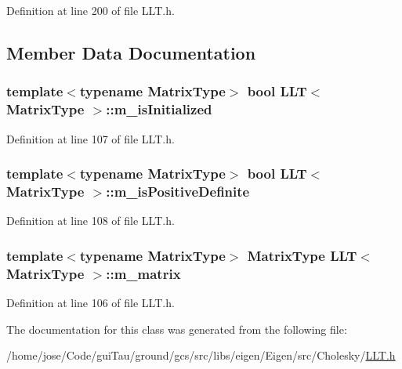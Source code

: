 Definition at line 200 of file L\-L\-T.\-h.



\subsection{Member Data Documentation}
\hypertarget{class_l_l_t_a538a8165865c01777995af8f30e9778a}{
\subsubsection[{m\-\_\-is\-Initialized}]{\setlength{\rightskip}{0pt plus 5cm}template$<$typename Matrix\-Type$>$ bool {\bf L\-L\-T}$<$ Matrix\-Type $>$\-::m\-\_\-is\-Initialized\hspace{0.3cm}{\ttfamily [protected]}}}\label{class_l_l_t_a538a8165865c01777995af8f30e9778a}


Definition at line 107 of file L\-L\-T.\-h.

\hypertarget{class_l_l_t_a8e208b8ab05b525407b50a4047aaae73}{
\subsubsection[{m\-\_\-is\-Positive\-Definite}]{\setlength{\rightskip}{0pt plus 5cm}template$<$typename Matrix\-Type$>$ bool {\bf L\-L\-T}$<$ Matrix\-Type $>$\-::m\-\_\-is\-Positive\-Definite\hspace{0.3cm}{\ttfamily [protected]}}}\label{class_l_l_t_a8e208b8ab05b525407b50a4047aaae73}


Definition at line 108 of file L\-L\-T.\-h.

\hypertarget{class_l_l_t_a5750c879b44118e0d497b84c578a2c89}{
\subsubsection[{m\-\_\-matrix}]{\setlength{\rightskip}{0pt plus 5cm}template$<$typename Matrix\-Type$>$ Matrix\-Type {\bf L\-L\-T}$<$ Matrix\-Type $>$\-::m\-\_\-matrix\hspace{0.3cm}{\ttfamily [protected]}}}\label{class_l_l_t_a5750c879b44118e0d497b84c578a2c89}


Definition at line 106 of file L\-L\-T.\-h.



The documentation for this class was generated from the following file\-:\begin{DoxyCompactItemize}
\item 
/home/jose/\-Code/gui\-Tau/ground/gcs/src/libs/eigen/\-Eigen/src/\-Cholesky/\hyperlink{_l_l_t_8h}{L\-L\-T.\-h}\end{DoxyCompactItemize}
